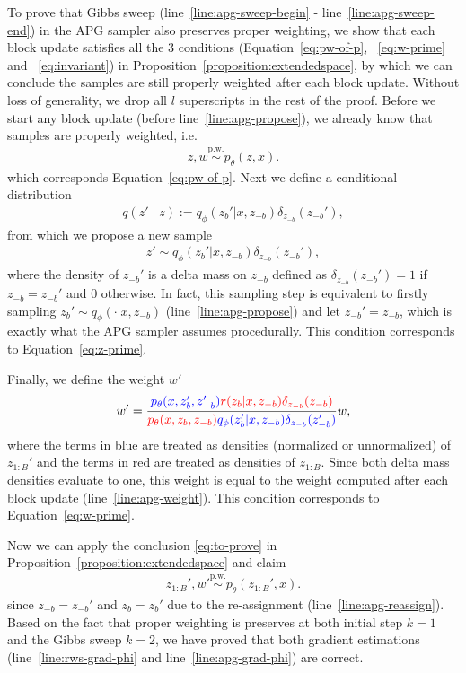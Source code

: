 \documentclass[anonymous=false, %
               format=acmsmall, %
               review=true, %
               screen=true, %
               nonacm=true]{acmart}
\theoremstyle{definition}
\newcommand{\given}{\lvert}
\newcommand{\pw}{\overset{\text{p.w.}}{\sim}
}
\begin{document}
To prove that Gibbs sweep (line~\ref{line:apg-sweep-begin} - line~\ref{line:apg-sweep-end}) in the APG sampler also preserves proper weighting, we show that each block update satisfies all the 3 conditions (Equation~\ref{eq:pw-of-p}, ~\ref{eq:w-prime} and ~\ref{eq:invariant}) in Proposition~\ref{proposition:extendedspace}, by which we can conclude the samples are still properly weighted after each block update. Without loss of generality, we drop all $l$ superscripts in the rest of the proof. Before we start any block update (before line~\ref{line:apg-propose}),  we already know that samples are properly weighted, i.e.
\begin{align}
    z, w \pw p_\theta(z, x).
\end{align}
which corresponds Equation~\ref{eq:pw-of-p}. Next we define a conditional distribution 
\begin{align*}
q(z' \mid z):= q_\phi(z_b' \given x, z_{-b}) \delta_{z_{-b}}(z_{-b}'),
\end{align*}
from which we propose a new sample
\begin{align}
    z' \sim q_\phi(z_b' \given x, z_{-b}) \delta_{z_{-b}}(z_{-b}'),
\end{align}
where the density of $z_{-b}'$ is a delta mass on $z_{-b}$ defined as $\delta_{z_{-b}}(z_{-b}') = 1$ if $z_{-b} = z_{-b}'$ and $0$ otherwise.
In fact, this sampling step is equivalent to firstly sampling $z_b' \sim q_\phi(\cdot \given x, z_{-b})$ (line~\ref{line:apg-propose}) and let $z_{-b}' = z_{-b}$, which is exactly what the APG sampler assumes procedurally. This condition corresponds to Equation~\ref{eq:z-prime}.

Finally, we define the weight $w'$
\begin{align}
    w' = \frac{{\color{blue}p_\theta(x, z_b', z_{-b}')} {\color{red}r(z_b \given x, z_{-b}) \delta_{z_{-b}}(z_{-b})}}{{\color{red}p_\theta(x, z_b, z_{-b})} {\color{blue}q_\phi(z_b' \given x, z_{-b}) \delta_{z_{-b}}(z_{-b}')}} w,
\end{align}
where the terms in blue are treated as densities (normalized or unnormalized) of $z_{1:B}'$ and the terms in red are treated as densities of $z_{1:B}$.
Since both delta mass densities evaluate to one, this weight is equal to the weight computed after each block update (line~\ref{line:apg-weight}). This condition corresponds to Equation~\ref{eq:w-prime}.

Now we can apply the conclusion \eqref{eq:to-prove} in Proposition~\ref{proposition:extendedspace} and claim 
\begin{align*}
z_{1:B}', w' \pw p_\theta(z_{1:B}', x)
.
\end{align*}
since $z_{-b} = z_{-b}'$ and $z_b = z_b'$ due to the re-assignment (line~\ref{line:apg-reassign}). Based on the fact that proper weighting is preserves at both initial step $k=1$ and the Gibbs sweep $k=2$, we have proved that both gradient estimations (line~\ref{line:rws-grad-phi} and line~\ref{line:apg-grad-phi}) are correct.
\end{document}
